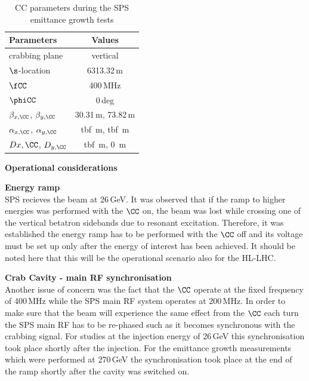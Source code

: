 \begin{table}[!hbt]
   \centering
   \caption{CC parameters during the SPS emittance growth tests}
   \begin{tabular}{lc}
       \toprule
       \textbf{Parameters} & \textbf{Values}\\
       \bottomrule
       crabbing plane & vertical \\
       $\s$-location & 6313.32\,m \\
      $\fCC$  & 400\,MHz   \\ 
      $\phiCC$  & 0\,deg   \\ 
      \bottomrule
      $\beta_{x, \CC}$, $\beta_{y, \CC}$  & 30.31\,m,  73.82\,m \\
      $\alpha_{x, \CC}$, $\alpha_{y, \CC}$  & tbf \,m,  tbf \,m \\
      $D{x, \CC}$, $D_{y, \CC}$  & tbf \,m,  0 \,m \\     
      \bottomrule
   \end{tabular}
   \label{tab:SPS_CCs}
\end{table}



\large{\textbf{Operational considerations}}

\normalsize{\textbf{Energy ramp}}\\
SPS recieves the beam at 26\,GeV. It was observed that if the ramp to higher energies was performed with the $\CC$ on, the beam was lost while crossing one of the vertical betatron sidebands due to resonant excitation. Therefore, it was established the energy ramp has to be performed with the $\CC$ off and its voltage must be set up only after the energy of interest has been achieved. It should be noted here that this will be the operational scenario also for the HL-LHC.

\normalsize{\textbf{Crab Cavity - main RF synchronisation}}\\
Another issue of concern was the fact that the $\CC$ operate at the fixed frequency of 400\,MHz while the SPS main RF system operates at 200\,MHz.
In order to make sure that the beam will experience the same effect from the $\CC$ each turn the SPS main RF has to be re-phased such as it becomes synchronous with the crabbing signal. For studies at the injection energy of 26\,GeV this synchronisation took place shortly after the injection. For the emittance growth measurements which were performed at 270\,GeV the synchronisation took place at the end of the ramp shortly after the cavity was switched on.

